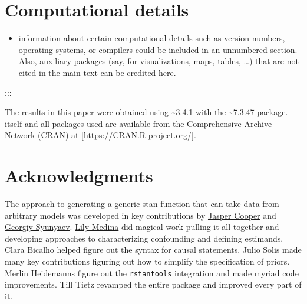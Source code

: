 \documentclass[
  article]{jss}
\providecommand{\tightlist}{%
  \setlength{\itemsep}{0pt}\setlength{\parskip}{0pt}}\usepackage{longtable,booktabs,array}
\begin{document}
\hypertarget{computational-details}{%
\section*{Computational details}\label{computational-details}}

\begin{itemize}
\tightlist
\item
  information about certain computational details such as version
  numbers, operating systems, or compilers could be included in an
  unnumbered section. Also, auxiliary packages (say, for visualizations,
  maps, tables, \ldots) that are not cited in the main text can be
  credited here.
\end{itemize}

:::

The results in this paper were obtained using
\textasciitilde3.4.1 with the
\textasciitilde7.3.47 package.  itself and all
packages used are available from the Comprehensive  Archive
Network (CRAN) at {[}https://CRAN.R-project.org/{]}.

\hypertarget{acknowledgments}{%
\section*{Acknowledgments}\label{acknowledgments}}

\begin{tcolorbox}[enhanced jigsaw, leftrule=.75mm, breakable, toprule=.15mm, left=2mm, opacityback=0, colback=white, arc=.35mm, bottomrule=.15mm, rightrule=.15mm]

The approach to generating a generic stan function that can take data
from arbitrary models was developed in key contributions by
\href{http://jasper-cooper.com/}{Jasper Cooper} and
\href{http://gsyunyaev.com/}{Georgiy Syunyaev}.
\href{https://lilymedina.github.io/}{Lily Medina} did magical work
pulling it all together and developing approaches to characterizing
confounding and defining estimands. Clara Bicalho helped figure out the
syntax for causal statements. Julio Solis made many key contributions
figuring out how to simplify the specification of priors. Merlin
Heidemanns figure out the \texttt{rstantools} integration and made
myriad code improvements. Till Tietz revamped the entire package and
improved every part of it.

\end{tcolorbox}
\end{document}
